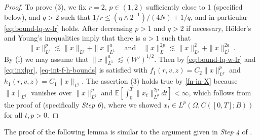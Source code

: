 \documentclass[final]{amsart}
\numberwithin{thm}{section}
\numberwithin{equation}{section}
\newcommand{\E}{\mathbb{E}}
\begin{document}
\begin{proof}
To prove (3), we fix $r = 2$, 
$p \in (1, 2)$ sufficiently close to 1 (specified below), and 
$q > 2$ such that $1/r \leq (\eta \wedge 2^{-1})/(4N) + 1/q$, and in particular \eqref{eq:bound-lq-w-lr} holds. 
After decreasing $p > 1$ and $q > 2$ if necessary, H\" older's and Young's inequalities imply that there is $a > 1$ such that
\begin{equation}\label{eq:inxlpr}
\|x\|_{L^r}^p \lesssim \|x\|_{L^q} + \|x\|_{L^1}^a \quad \text{and} \quad \|x\|_{L^r}^{2p} \lesssim \|x\|_{L^q}^2 + \|x\|_{L^1}^{2a} \,.
\end{equation}
By (i) we may assume that $\|x\|_{L^1}^a \lesssim (W')^{1/2}$. Then by \eqref{eq:bound-lq-w-lr} and \eqref{eq:inxlpr}, \eqref{eq-int-f-h-bounds} is satisfied with $f_1(r,v,z) = C_2\|x\|_{L^q}^p$ and $h_1(r,v,z) = C_1\|x\|_{L^q}$. The assertion (3) holds true by \eqref{fn-in-X} because  
$\|x\|_{L^q}$ vanishes over $\|x\|_{L^q}^p$ and 
$\E[\int_0^T \|x_t\|_{L^q}^{2p}dt] < \infty$, which follows from 
 the proof of  (specifically \textit{Step 6}), where we showed $x_t \in L^p(\Omega, C([0,T];B))$ for all $t,p > 0$. 
\end{proof}


The proof of the following lemma is similar to the argument given in \textit{Step 4} of .
\end{document}
